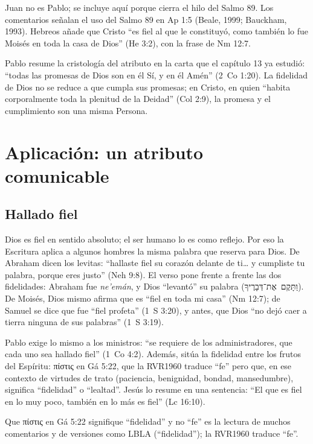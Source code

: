 \documentclass[11pt,letterpaper]{article}
\newcommand{\heb}[1]{\mbox{\foreignlanguage{hebrew}{#1}}}
\newcommand{\grc}[1]{\foreignlanguage{ancientgreek}{#1}}
\begin{document}
\begin{nota}[Precisión]
Juan no es Pablo; se incluye aquí porque cierra el hilo del Salmo 89. Los comentarios señalan el uso del Salmo 89 en Ap 1:5 (Beale, 1999; Bauckham, 1993). Hebreos añade que Cristo ``es fiel al que le constituyó, como también lo fue Moisés en toda la casa de Dios'' (He 3:2), con la frase de Nm 12:7.
\end{nota}

Pablo resume la cristología del atributo en la carta que el capítulo 13 ya estudió: ``todas las promesas de Dios son en él Sí, y en él Amén'' (2~Co 1:20). La fidelidad de Dios no se reduce a que cumpla sus promesas; en Cristo, en quien ``habita corporalmente toda la plenitud de la Deidad'' (Col 2:9), la promesa y el cumplimiento son una misma Persona.

\section{Aplicación: un atributo comunicable}

\subsection{Hallado fiel}
Dios es fiel en sentido absoluto; el ser humano lo es como reflejo. Por eso la Escritura aplica a algunos hombres la misma palabra que reserva para Dios. De Abraham dicen los levitas: ``hallaste fiel su corazón delante de ti\ldots{} y cumpliste tu palabra, porque eres justo'' (Neh 9:8). El verso pone frente a frente las dos fidelidades: Abraham fue \emph{ne'emán}, y Dios ``levantó'' su palabra (\heb{וַתָּקֶם אֶת־דְּבָרֶיךָ}). De Moisés, Dios mismo afirma que es ``fiel en toda mi casa'' (Nm 12:7); de Samuel se dice que fue ``fiel profeta'' (1~S 3:20), y antes, que Dios ``no dejó caer a tierra ninguna de sus palabras'' (1~S 3:19).

Pablo exige lo mismo a los ministros: ``se requiere de los administradores, que cada uno sea hallado fiel'' (1~Co 4:2). Además, sitúa la fidelidad entre los frutos del Espíritu: \grc{πίστις} en Gá 5:22, que la RVR1960 traduce ``fe'' pero que, en ese contexto de virtudes de trato (paciencia, benignidad, bondad, mansedumbre), significa ``fidelidad'' o ``lealtad''. Jesús lo resume en una sentencia: ``El que es fiel en lo muy poco, también en lo más es fiel'' (Lc 16:10).

\begin{nota}[Precisión]
Que \grc{πίστις} en Gá 5:22 signifique ``fidelidad'' y no ``fe'' es la lectura de muchos comentarios y de versiones como LBLA (``fidelidad''); la RVR1960 traduce ``fe''.
\end{nota}
\end{document}
